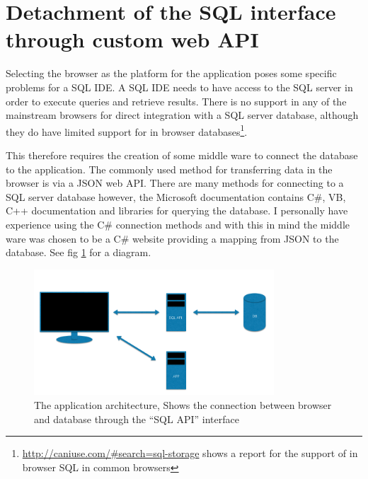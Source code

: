 \section{Detachment of the SQL interface through custom web
API}\label{detachment-of-the-sql-interface-through-custom-web-api}

Selecting the browser as the platform for the application poses some specific
problems for a SQL IDE. A SQL IDE
needs to have access to the SQL server in order to execute queries and retrieve
results. There is no support in any of the mainstream browsers for direct
integration with a SQL server database, although they do have limited support
for in browser databases\footnote{\url{http://caniuse.com/\#search=sql-storage}
shows a report for the support of in browser SQL in common browsers}.

This therefore requires the creation of some middle ware to connect the database
to the application. The commonly used method for transferring data in the
browser is via a JSON web API. There are many methods for connecting to a SQL
server database however, the Microsoft documentation contains C\#, VB, C++
documentation and libraries for querying the database.\cite{sqlserverconnect} I
personally have experience using the C\# connection methods and with this in mind
the middle ware was chosen to be a C\# website providing a mapping from JSON to
the database. See fig \ref{fig:apparch} for a diagram.

\begin{figure}
  \includegraphics[width=0.8\textwidth]{Figures/ApplicationArch.png}
  \caption{The application architecture, Shows the connection between browser
  and database through the ``SQL API'' interface }
  \label{fig:apparch}
\end{figure}
